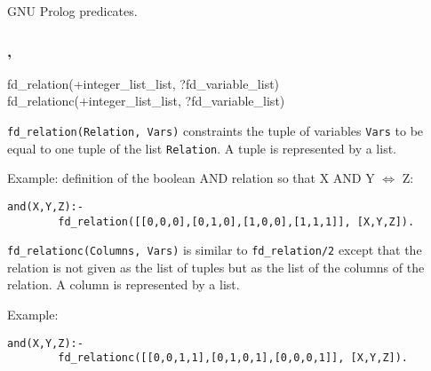\Portability

GNU Prolog predicates.

\subsubsection{,
               }

\begin{TemplatesOneCol}
fd\_relation(+integer\_list\_list, ?fd\_variable\_list)\\
fd\_relationc(+integer\_list\_list, ?fd\_variable\_list)

\end{TemplatesOneCol}

\Description

\texttt{fd\_relation(Relation, Vars)} constraints the tuple of variables
\texttt{Vars} to be equal to one tuple of the list \texttt{Relation}. A
tuple is represented by a list.

Example: definition of the boolean AND relation so that X AND Y
$\Leftrightarrow$ Z:

\begin{Indentation}
\begin{verbatim}
and(X,Y,Z):-
        fd_relation([[0,0,0],[0,1,0],[1,0,0],[1,1,1]], [X,Y,Z]).
\end{verbatim}
\end{Indentation}

\texttt{fd\_relationc(Columns, Vars)} is similar to \texttt{fd\_relation/2}
except that the relation is not given as the list of tuples but as the list
of the columns of the relation. A column is represented by a list.

Example:

\begin{Indentation}
\begin{verbatim}
and(X,Y,Z):-
        fd_relationc([[0,0,1,1],[0,1,0,1],[0,0,0,1]], [X,Y,Z]).
\end{verbatim}
\end{Indentation}

\begin{PlErrors}







\end{PlErrors}

